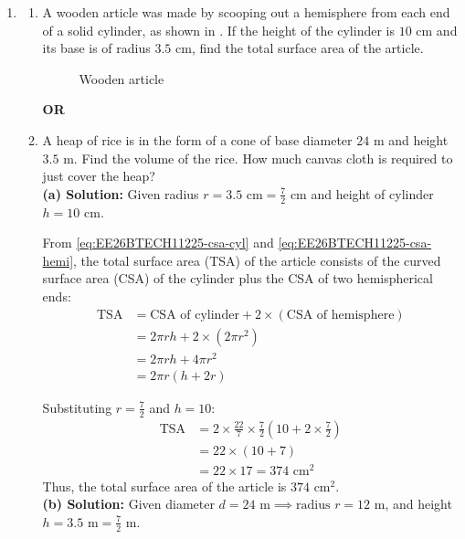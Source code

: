 \begin{enumerate}[label=\thesubsection.\arabic*, ref=\thesubsection.\theenumi]
Thus, the area of the shaded region is $30.96\text{ cm}^2$.
	\item 
    \begin{enumerate}[label=(\alph*), leftmargin=1.5em, labelsep=0.5em]
        \item A wooden article was made by scooping out a hemisphere from each end of a solid cylinder, as shown in . If the height of the cylinder is $10\text{ cm}$ and its base is of radius $3.5\text{ cm}$, find the total surface area of the article.
        
        \begin{figure}[H]
            \centering
            
            \caption{Wooden article}
            \label{fig:wooden_q21}
        \end{figure}
        
        \vspace{0.5em}
        \begin{center}
            \textbf{OR}
        \end{center}
        \vspace{0.5em}

        \item A heap of rice is in the form of a cone of base diameter $24\text{ m}$ and height $3.5\text{ m}$. Find the volume of the rice. How much canvas cloth is required to just cover the heap?	\\[2pt]
        \noindent\textbf{(a) Solution:} Given radius $r = 3.5\text{ cm} = \frac{7}{2}\text{ cm}$ and height of cylinder $h = 10\text{ cm}$.

From \eqref{eq:EE26BTECH11225-csa-cyl} and \eqref{eq:EE26BTECH11225-csa-hemi}, the total surface area (TSA) of the article consists of the curved surface area (CSA) of the cylinder plus the CSA of two hemispherical ends:
\begin{align}
    \text{TSA} &= \text{CSA of cylinder} + 2 \times (\text{CSA of hemisphere}) \\
    &= 2\pi r h + 2 \times (2\pi r^2) \\
    &= 2\pi r h + 4\pi r^2 \\
    &= 2\pi r (h + 2r)
\end{align}

Substituting $r = \frac{7}{2}$ and $h = 10$:
\begin{align}
    \text{TSA} &= 2 \times \frac{22}{7} \times \frac{7}{2} \left( 10 + 2 \times \frac{7}{2} \right) \\
    &= 22 \times (10 + 7) \\
    &= 22 \times 17 = 374\text{ cm}^2
\end{align}
Thus, the total surface area of the article is $374\text{ cm}^2$. \\[8pt]
\noindent\textbf{(b) Solution:} Given diameter $d = 24\text{ m} \implies \text{radius } r = 12\text{ m}$, and height $h = 3.5\text{ m} = \frac{7}{2}\text{ m}$.


\end{enumerate}
\end{enumerate}
